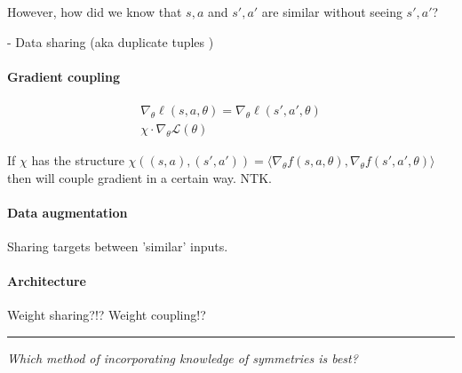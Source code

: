 
However, how did we know that $s, a$ and $s', a'$ are similar without seeing $s', a'$?

- Data sharing (aka duplicate tuples \cite{Ho2019a})

\paragraph{Gradient coupling}

\begin{align*}
\nabla_{\theta} \ell(s, a, \theta) = \nabla_{\theta} \ell(s', a', \theta) \\
\chi \cdot \nabla_{\theta} \mathcal L(\theta)
\end{align*}

If $\chi$ has the structure $\chi((s, a), (s', a')) = \langle \nabla_{\theta}f(s, a, \theta), \nabla_{\theta} f(s', a', \theta) \rangle$ then will couple gradient in a certain way. NTK.

\cite{Ho2019a}

\paragraph{Data augmentation}

Sharing targets between 'similar' inputs.

\paragraph{Architecture}

Weight sharing?!? Weight coupling!?
\cite{Ravanbakhsh2017a,Abdolhosseini}
\cite{Anselmi2019}

\begin{center}\rule{0.5\linewidth}{\linethickness}\end{center}

\begin{displayquote}
\textit{Which method of incorporating knowledge of symmetries is best?}
\end{displayquote}


